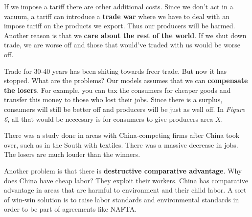 \documentclass{article}
\begin{document}
If we impose a tariff there are other additional costs. Since we don't act in a
vacuum, a tariff can introduce a \textbf{trade war} where we have to deal with
an impose tariff on the products we export. Thus our producers will be harmed.
Another reason is that we \textbf{care about the rest of the world}. If we shut
down trade, we are worse off and those that would've traded with us would be
worse off.

Trade for 30-40 years has been shiting towards freer trade. But now it has
stopped. What are the problems? Our models assumes that we can
\textbf{compensate the losers}. For example, you can tax the consumers for
cheaper goods and transfer this money to those who lost their jobs. Since there
is a surplus, consumers will still be better off and producers will be just as
well off. In \textit{Figure 6}, all that would be neccesary is for consumers to
give producers area $X$.

There was a study done in areas with China-competing firms after China took
over, such as in the South with textiles. There was a massive decrease in jobs.
The losers are much louder than the winners.

Another problem is that there is \textbf{destructive comparative advantage}. Why
does China have cheap labor? They exploit their workers. China has comparative
advantage in areas that are harmful to environment and their child labor. A sort
of win-win solution is to raise labor standards and environmental standards in
order to be part of agreements like NAFTA.
\end{document}
